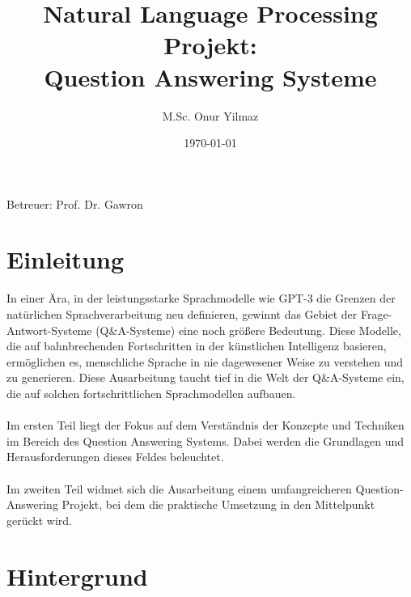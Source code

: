 \documentclass[12pt, a4paper]{article}
\title{Natural Language Processing Projekt: \\ Question Answering Systeme}
\author{M.Sc. Onur Yilmaz}
\date{\today}
\newcommand{\supervisor}{Betreuer: Prof. Dr. Gawron}
\begin{document}
	
	\maketitle
	
	\begin{center}
		\supervisor
	\end{center}

\thispagestyle{empty}
\newpage
\tableofcontents
\thispagestyle{empty}
\newpage

\section*{Einleitung}
In einer Ära, in der leistungsstarke Sprachmodelle wie GPT-3 die Grenzen der natürlichen Sprachverarbeitung neu definieren, gewinnt das Gebiet der Frage-Antwort-Systeme (Q\&A-Systeme) eine noch größere Bedeutung. Diese Modelle, die auf bahnbrechenden Fortschritten in der künstlichen Intelligenz basieren, ermöglichen es, menschliche Sprache in nie dagewesener Weise zu verstehen und zu generieren. Diese Ausarbeitung taucht tief in die Welt der Q\&A-Systeme ein, die auf solchen fortschrittlichen Sprachmodellen aufbauen. 
\\ \\
Im ersten Teil liegt der Fokus auf dem Verständnis der Konzepte und Techniken im Bereich des Question Answering Systems. Dabei werden die Grundlagen und Herausforderungen dieses Feldes beleuchtet. 
\\ \\
Im zweiten Teil widmet sich die Ausarbeitung einem umfangreicheren Question-Answering Projekt, bei dem die praktische Umsetzung in den Mittelpunkt gerückt wird.





\newpage
\setcounter{page}{1}
\section{Hintergrund}
\end{document}
